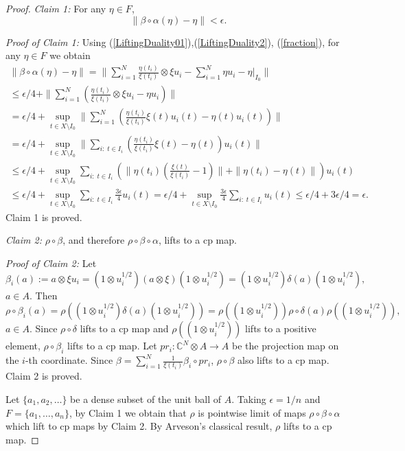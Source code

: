 \documentclass{article}%
\begin{document}
\begin{proof}
{\it Claim 1:} For any $\eta\in F$, $$\|\beta\circ\alpha (\eta) - \eta\|< \epsilon.$$

{\it Proof of Claim 1:}  Using (\ref{LiftingDuality01}),(\ref{LiftingDuality2}), (\ref{fraction}), for any $\eta\in F$ we obtain
\begin{multline*}  \|\beta\circ\alpha (\eta) - \eta\| = \|\sum_{i=1}^N \frac{\eta(t_i)}{\xi(t_i)}\otimes \xi u_i - \sum_{i=1}^N \eta u_i - \eta|_{I_0}\| \\ \le \epsilon/4 + \|\sum_{i=1}^N \left(\frac{\eta(t_i)}{\xi(t_i)}\otimes \xi u_i - \eta u_i\right)\| \\
=\epsilon/4 + \sup_{t\in X\setminus I_0} \|\sum_{i=1}^N \left(\frac{\eta(t_i)}{\xi(t_i)}\xi(t)u_i(t) - \eta(t)u_i(t)\right)\|\\
=\epsilon/4 + \sup_{t\in X\setminus I_0} \|\sum_{i:\; t\in I_i} \left(\frac{\eta(t_i)}{\xi(t_i)}\xi(t)-\eta(t)\right)u_i(t)\|\\
\le \epsilon/4 + \sup_{t\in X\setminus I_0} \sum_{i:\; t\in I_i}\left( \|\eta(t_i)(\frac{\xi(t)}{\xi(t_i)}-1)\|+ \|\eta(t_i)-\eta(t)\|\right)u_i(t) \\
\le \epsilon/4 + \sup_{t\in X\setminus I_0} \sum_{i:\; t\in I_i}\frac{3\epsilon}{4} u_i(t) = \epsilon/4 + \sup_{t\in X\setminus I_0} \frac{3\epsilon}{4}
\sum_{i:\; t\in I_i} u_i(t) \le \epsilon/4 + 3\epsilon/4  = \epsilon.
\end{multline*}
Claim 1 is proved.

\medskip

{\it Claim 2:} $\rho\circ \beta$, and therefore $\rho\circ \beta\circ \alpha$,   lifts to a cp map.

{\it Proof of Claim 2:}  Let
$$\beta_i(a) := a\otimes \xi u_i = \left(1\otimes u_i^{1/2}\right)(a\otimes \xi) \left(1\otimes u_i^{1/2}\right) = \left(1\otimes u_i^{1/2}\right)\delta(a) \left(1\otimes u_i^{1/2}\right),$$ $a\in A$. Then
$$\rho \circ \beta_i(a)  = \rho\left(\left(1\otimes u_i^{1/2}\right)\delta(a) \left(1\otimes u_i^{1/2}\right)\right) = \rho\left(\left(1\otimes u_i^{1/2}\right)\right) \rho\circ\delta(a) \rho\left(\left(1\otimes u_i^{1/2}\right)\right), $$ $a\in A$.
Since $\rho\circ\delta$ lifts to a cp map and $\rho\left(\left(1\otimes u_i^{1/2}\right)\right)$ lifts to a positive element, $\rho\circ \beta_i$ lifts to a cp map. Let $pr_i: \mathbb C^N\otimes A\to A$ be the projection map on the $i$-th coordinate. Since $\beta = \sum_{i=1}^N \frac{1}{\xi(t_i)}\beta_i\circ pr_i$, $\rho\circ \beta$ also lifts to a cp map.  Claim 2 is proved.

\medskip
Let $\{a_1, a_2, \ldots\}$ be a dense subset of the unit ball of $A$.
Taking $\epsilon = 1/n$ and $F= \{a_1, \ldots, a_n\}$, by Claim 1 we obtain that $\rho$ is pointwise limit of maps $\rho\circ \beta\circ\alpha$ which lift to cp  maps by Claim 2. By Arveson's classical result, $\rho$ lifts to a cp map.
\end{proof}
\end{document}
